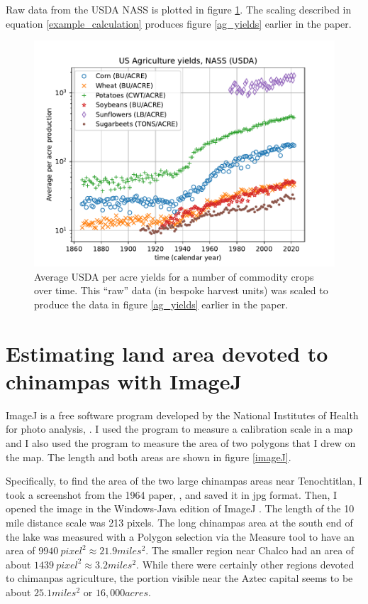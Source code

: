 \documentclass[12pt]{iopart}
\begin{document}
Raw data from the USDA NASS is plotted in figure \ref{raw_production_per_acre}.  The scaling described in equation \ref{example_calculation} produces figure \ref{ag_yields} earlier in the paper.
\begin{figure}[ht!]
\centering
\includegraphics[width=\columnwidth]{raw_production_per_acre.pdf}
\caption{
Average USDA per acre yields for a number of commodity crops over time.  This ``raw'' data (in bespoke harvest units) was scaled to produce the data in figure \ref{ag_yields} earlier in the paper. 
}
\label{raw_production_per_acre}
\end{figure}


\clearpage

\section{Estimating land area devoted to chinampas with ImageJ}
\label{appx_imageJ}

ImageJ is a free software program developed by the National Institutes of Health for photo analysis, \cite{imageJ}.  I used the program to measure a calibration scale in a map and I also used the program to measure the area of two polygons that I drew on the map.  The length and both areas are shown in figure \ref{imageJ}.

Specifically, to find the area of the two large chinampas areas near Tenochtitlan, I took a screenshot from the 1964 paper, \cite{Chinampas_1964}, and saved it in jpg format.  Then, I opened the image in the Windows-Java edition of ImageJ \cite{imageJ}.  The length of the 10 mile distance scale was 213 pixels. The long chinampas area at the south end of the lake was measured with a Polygon selection via the Measure tool to have an area of $9940~pixel^2\approx21.9miles^2$.  The smaller region near Chalco had an area of about $1439~pixel^2\approx3.2miles^2$.  While there were certainly other regions devoted to chimanpas agriculture, the portion visible near the Aztec capital seems to be about $25.1miles^2$ or $16,000acres$.  
\end{document}
